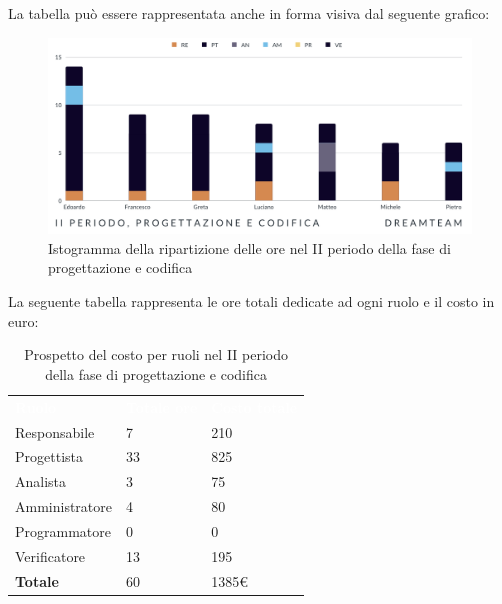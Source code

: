 La tabella può essere rappresentata anche in forma visiva dal seguente grafico:
\begin{figure}[H]
\centering
\includegraphics[scale=0.65]{Sezioni/SezioniPreventivo/grafici/Progettazione_codifica_II_periodo.png}
\caption{Istogramma della ripartizione delle ore nel II periodo della fase di progettazione e codifica}
\end{figure}

La seguente tabella rappresenta le ore totali dedicate ad ogni ruolo e il costo in euro:

\begin{table}[H]
\begin{center}
\renewcommand{\arraystretch}{1.5}
\begin{tabular}{ m{}<{\centering}  m{}<{\centering} m{}<{\centering}}
	\rowcolor{darkblue}
	\textcolor{white}{\textbf{Ruolo}}&\textcolor{white}{\textbf{Totale ore}}&\textcolor{white}{\textbf{Costo totale}}\\ 

	Responsabile  & 7 & 210 \\	
	
	Progettista & 33 & 825 \\
	
	Analista & 3 & 75 \\

	Amministratore & 4 & 80 \\
	
	Programmatore & 0 & 0 \\
	
	Verificatore & 13 & 195 \\
	
	\textbf{Totale} & 60 & 1385\euro \\
	
\end{tabular}
\caption{Prospetto del costo per ruoli nel II periodo della fase di progettazione e codifica}
\end{center}
\end{table}


